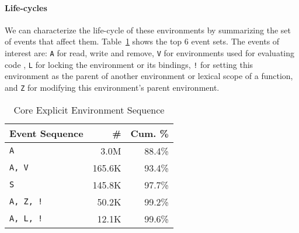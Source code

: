 \documentclass[10pt,review,sigplan,anonymous=true,authorversion=true,nonacm=true]{acmart}
\begin{document}
\paragraph{Life-cycles}
We can characterize the life-cycle of these environments by summarizing the set
of events that affect them. Table~\ref{table:core_explicit_env_seq} shows the
top 6 event sets. The events of interest are: \texttt{A} for read, write and
remove, \texttt{V} for environments used for evaluating code , \texttt{L} for
locking the environment or its bindings, \texttt{!} for setting this environment
as the parent of another environment or lexical scope of a function, and
\texttt{Z} for modifying this environment's parent environment.

\begin{table}[!h]
  \vspace{-3mm}
  \small
  \caption{Core Explicit Environment Sequence} \label{table:core_explicit_env_seq}
  \centering
  \begin{tabular}{lrr}
    \toprule
    \textbf{Event Sequence}&\textbf{\#}&\textbf{Cum. \%}\\
    \midrule
    \texttt{A}&3.0M&88.4\%\\
    \texttt{A, V}&165.6K&93.4\%\\
    \texttt{S}&145.8K&97.7\%\\
    \texttt{A, Z, !}&50.2K&99.2\%\\
    \texttt{A, L, !}&12.1K&99.6\%\\
    \bottomrule
  \end{tabular}
\end{table}
\end{document}

